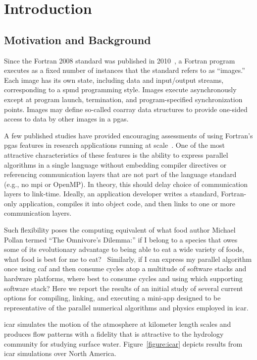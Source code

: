 \section{Introduction}
\subsection{Motivation and Background}
Since the Fortran 2008 standard was published in 2010~\cite{iso2010information}, a Fortran program executes as
a fixed number of instances that the standard refers to as ``images.''  Each image has its own state, including
data and input/output streams, corresponding to a \gls{spmd} programming style.  Images execute asynchronously
except at program launch, termination, and program-specified synchronization points.  Images may define
so-called coarray data structures to provide one-sided access to data by other images in a \gls{pgas}.

A few published studies have provided encouraging assessments of using Fortran's \gls{pgas} features
in research applications running at scale~\cite{preissl2011multithreaded,garain2015comparing,mozdzynski2015partitioned}.
One of the most attractive characteristics of these features is the ability to express parallel algorithms in a single
language without embedding compiler directives or referencing communication layers that are not part of the
language standard (e.g., no \gls{mpi} or OpenMP).  In theory, this should delay choice of communication layers
to link-time.  Ideally, an application developer writes a standard, Fortran-only application, compiles it into object code,
and then links to one or more communication layers.

Such flexibility poses the computing equivalent of what food author Michael Pollan termed ``The Omnivore's Dilemma:'' if I
belong to a species that owes some of its evolutionary advantage to being able to eat a wide variety of foods, what food is
best for me to eat?~\cite{pollan2006omnivore}  Similarly, if I can express my parallel algorithm once using \gls{caf} and then consume cycles atop a
multitude of software stacks and hardware platforms, where best to consume cycles and using which supporting software stack?
Here we report the results of an initial study of several current options for compiling, linking, and executing a \gls{mini-app}
designed to be representative of the parallel numerical algorithms and physics employed in \gls{icar}.

\gls{icar} simulates the motion of the atmosphere at kilometer length scales and produces flow patterns with a fidelity that is
attractive to the hydrology community for studying surface water.  Figure~\ref{figure:icar} depicts results from  \gls{icar}
simulations over North America.

